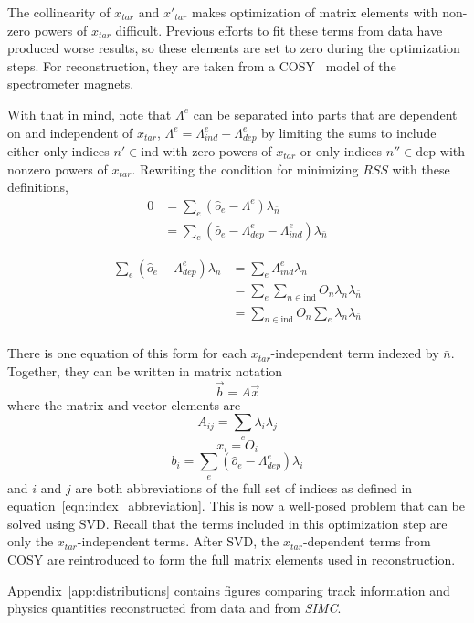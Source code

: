 The collinearity of $x_{tar}$ and $x'_{tar}$ makes optimization of matrix
elements with non-zero powers of $x_{tar}$ difficult.
Previous efforts to fit these terms from data have produced worse results, so
these elements are set to zero during the optimization steps.
For reconstruction, they are taken from a COSY~\cite{COSY_9} model of the
spectrometer magnets.


With that in mind, note that $\Lambda^e$ can be separated into parts that are
dependent on and independent of $x_{tar}$,
$\Lambda^e = \Lambda^e_{ind} + \Lambda^e_{dep}$
by limiting the sums to include either
only indices $n'\in\text{ind}$ with zero powers of $x_{tar}$
or
only indices $n''\in\text{dep}$ with nonzero powers of $x_{tar}$.
Rewriting the condition for minimizing $RSS$ with these definitions,
\begin{align}
    0 &= \sum_e (\hat{o}_e - \Lambda^e) \lambda_{\bar{n}} \\
      &= \sum_e (\hat{o}_e - \Lambda^e_{dep} - \Lambda^e_{ind}) \lambda_{\bar{n}}
\end{align}

\begin{align}
    \sum_e (\hat{o}_e - \Lambda^e_{dep}) \lambda_{\bar{n}} &= \sum_e \Lambda^e_{ind} \lambda_{\bar{n}} \\
            &= \sum_e \sum_{n\in\text{ind}} O_n \lambda_n \lambda_{\bar{n}} \\
            &= \sum_{n\in\text{ind}} O_n \sum_e \lambda_n \lambda_{\bar{n}} \\
\end{align}


There is one equation of this form for each $x_{tar}$-independent term indexed
by $\bar{n}$.
Together, they can be written in matrix notation
\begin{equation}
    \vec{b} = A \vec{x}
\end{equation}
where the matrix and vector elements are
\begin{equation}
    A_{ij} = \sum_e \lambda_i \lambda_j
\end{equation}
\begin{equation}
    x_i = O_i
\end{equation}
\begin{equation}
    b_i = \sum_e(\hat{o}_e - \Lambda^e_{dep}) \lambda_i
\end{equation}
and $i$ and $j$ are both abbreviations of the full set of indices as defined in
equation~\ref{eqn:index_abbreviation}.
This is now a well-posed problem that can be solved using SVD.
Recall that the terms included in this optimization step are only the
$x_{tar}$-independent terms.
After SVD, the $x_{tar}$-dependent terms from COSY are reintroduced to form the
full matrix elements used in reconstruction.

Appendix~\ref{app:distributions} contains figures comparing track information
and physics quantities reconstructed from data and from \textit{SIMC}.
